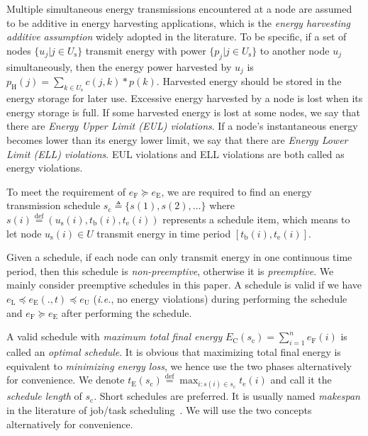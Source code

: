 \documentclass[12pt,journal,onecolumn,draftcls]{IEEEtran}
\begin{document}
Multiple simultaneous energy transmissions encountered at a node are assumed to be additive in energy harvesting applications, which is the \textit{energy harvesting additive assumption} widely adopted in the literature\cite{He2013,Dai2017TON,Dai2018TON}. To be specific, if a set of nodes $\{u_j|j{\in}U_\text{s}\}$ transmit energy with power $\{p_j|j{\in}U_\text{s}\}$ to another node $u_j$ simultaneously, then the energy power harvested by $u_j$ is $p_\text{H}(j){=}\sum_{k{\in}U_\text{s}}c(j,k){*}p(k)$. Harvested energy should be stored in the energy storage for later use. Excessive energy harvested by a node is lost when its energy storage is full. If some harvested energy is lost at some nodes, we say that there are \textit{Energy Upper Limit (EUL) violations}. If a node's instantaneous energy becomes lower than its energy lower limit, we say that there are \textit{Energy Lower Limit (ELL) violations}. EUL violations and ELL violations are both called as energy violations.

To meet the requirement of $e_\text{F}{\succeq}e_\text{E}$, we are required to find an energy transmission schedule $s_\text{c}{\triangleq}\{s(1),s(2),\ldots\}$ where $s(i){\mathop{=}\limits^\text{def}}(u_\text{s}(i), t_\text{b}(i),t_\text{e}(i))$ represents a schedule item, which means to let node $u_\text{s}(i){\in}U$ transmit energy in time period $[t_\text{b}(i),t_\text{e}(i)]$.

Given a schedule, if each node can only transmit energy in one continuous time period, then this schedule is \textit{non-preemptive}, otherwise it is \textit{preemptive}. We mainly consider preemptive schedules in this paper. A schedule is valid if we have $e_\text{L}{\preceq}e_\text{E}(.,t){\preceq}e_\text{U}$ (\textit{i.e.}, no energy violations) during performing the schedule and $e_\text{F}{\succeq}e_\text{E}$ after performing the schedule.

A valid schedule with \textit{maximum total final energy} $E_\text{C}(s_\text{c}){=}\sum_{i{=}1}^{n}e_\text{F}(i)$ is called an \textit{optimal schedule}. It is obvious that maximizing total final energy is equivalent to \textit{minimizing energy loss}, we hence use the two phases alternatively for convenience. We denote $t_\text{E}(s_\text{c}){\mathop{=}\limits^\text{def}}\max_{i{:}s(i){\in}s_\text{c}}t_\text{e}(i)$ and call it the \textit{schedule length} of $s_\text{c}$. Short schedules are preferred. It is usually named \textit{makespan} in the literature of job/task scheduling~\cite{Marx2004}. We will use the two concepts alternatively for convenience.
\end{document}
